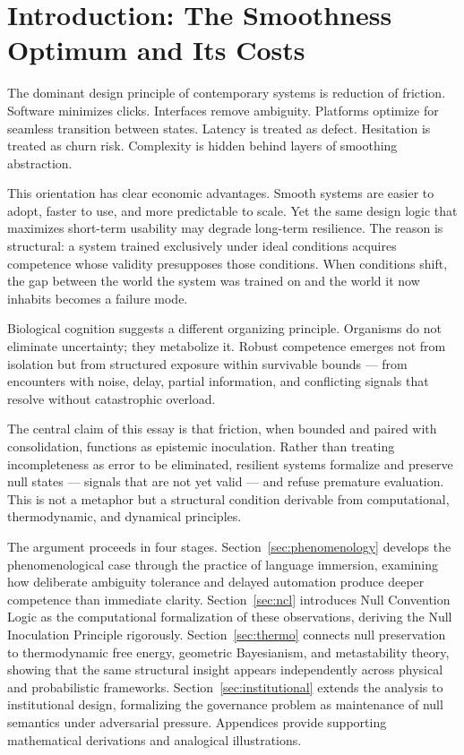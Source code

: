 \documentclass[11pt]{article}
\theoremstyle{remark}
\begin{document}

\section{Introduction: The Smoothness Optimum and Its Costs}
\label{sec:intro}

The dominant design principle of contemporary systems is reduction of friction. Software minimizes clicks. Interfaces remove ambiguity. Platforms optimize for seamless transition between states. Latency is treated as defect. Hesitation is treated as churn risk. Complexity is hidden behind layers of smoothing abstraction.

This orientation has clear economic advantages. Smooth systems are easier to adopt, faster to use, and more predictable to scale. Yet the same design logic that maximizes short-term usability may degrade long-term resilience. The reason is structural: a system trained exclusively under ideal conditions acquires competence whose validity presupposes those conditions. When conditions shift, the gap between the world the system was trained on and the world it now inhabits becomes a failure mode.

Biological cognition suggests a different organizing principle. Organisms do not eliminate uncertainty; they metabolize it. Robust competence emerges not from isolation but from structured exposure within survivable bounds — from encounters with noise, delay, partial information, and conflicting signals that resolve without catastrophic overload.

The central claim of this essay is that friction, when bounded and paired with consolidation, functions as epistemic inoculation. Rather than treating incompleteness as error to be eliminated, resilient systems formalize and preserve null states — signals that are not yet valid — and refuse premature evaluation. This is not a metaphor but a structural condition derivable from computational, thermodynamic, and dynamical principles.

The argument proceeds in four stages. Section~\ref{sec:phenomenology} develops the phenomenological case through the practice of language immersion, examining how deliberate ambiguity tolerance and delayed automation produce deeper competence than immediate clarity. Section~\ref{sec:ncl} introduces Null Convention Logic as the computational formalization of these observations, deriving the Null Inoculation Principle rigorously. Section~\ref{sec:thermo} connects null preservation to thermodynamic free energy, geometric Bayesianism, and metastability theory, showing that the same structural insight appears independently across physical and probabilistic frameworks. Section~\ref{sec:institutional} extends the analysis to institutional design, formalizing the governance problem as maintenance of null semantics under adversarial pressure. Appendices provide supporting mathematical derivations and analogical illustrations.
\end{document}
